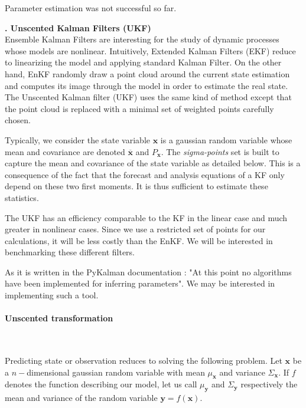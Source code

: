 \documentclass[a4paper]{article}
\newcounter{c}
\newcounter{d}
\newcounter{r}
\newcounter{e}
\newcommand{\chapitre}[1]{\stepcounter{c}\setcounter{e}{0}\setcounter{d}{0}\setcounter{r}{0}\noindent\textbf{\Large\arabic{c}. #1}\\}
\begin{document}
Parameter estimation was not successful so far.

\bigskip





\newpage
\chapitre{Unscented Kalman Filters (UKF)}

Ensemble Kalman Filters are interesting for the study of dynamic processes whose models are nonlinear. Intuitively, Extended Kalman Filters (EKF) reduce to linearizing the model and applying standard Kalman Filter. On the other hand, EnKF randomly draw a point cloud around the current state estimation and computes its image through the model in order to estimate the real state. The Unscented Kalman filter (UKF) uses the same kind of method except that the point cloud is replaced with a minimal set of weighted points carefully chosen.


Typically, we consider the state variable $\mathbf x$ is a gaussian random variable whose mean and covariance are denoted $\overline{\mathbf x}$ and $P_{\mathbf x}$. The \emph{sigma-points} set is built to capture the mean and covariance of the state variable as detailed below. This is a consequence of the fact that the forecast and analysis equations of a KF only depend on these two first moments. It is thus sufficient to estimate these statistics.


The UKF has an efficiency comparable to the KF in the linear case and much greater in nonlinear cases. Since we use a restricted set of points for our calculations, it will be less costly than the EnKF. We will be interested in benchmarking these different filters.


As it is written in the PyKalman documentation : "At this point no algorithms have been implemented for inferring parameters". We may be interested in implementing such a tool.



\paragraph{Unscented transformation}~


Predicting state or observation reduces to solving the following problem. Let $\mathbf x$ be a $n-$dimensional gaussian random variable with mean $\mu_{\mathbf x}$ and variance $\Sigma_{\mathbf x}$. If $f$ denotes the function describing our model, let us call $\mu_{\mathbf y}$ and $\Sigma_{\mathbf y}$ respectively the mean and variance of the random variable $\mathbf y=f(\mathbf x)$.
\end{document}
